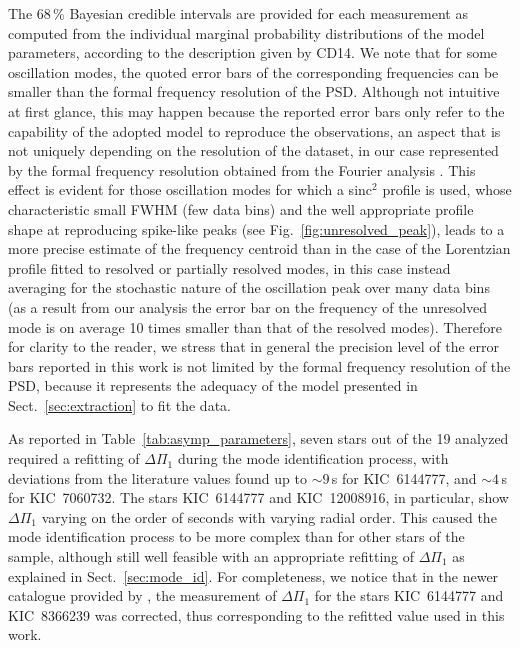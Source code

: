 \documentclass[structabstract]{aa}
\newcommand{\DP}{\Delta\Pi_1}
\newcommand{\kic}{KIC~12008916}
\begin{document}
The 68\,\% Bayesian credible intervals are provided for each measurement as computed from the individual marginal probability distributions of the model parameters, according to the description given by CD14. We note that for some oscillation modes, the quoted error bars of the corresponding frequencies can be smaller than the formal frequency resolution of the PSD. Although not intuitive at first glance, this may happen because the reported error bars only refer to the capability of the adopted model to reproduce the observations, an aspect that is not uniquely depending on the resolution of the dataset, in our case represented by the formal frequency resolution obtained from the Fourier analysis \citep[e.g. see][for more discussion on the presence of error bars smaller than the resolution given by the data, as obtained from another astrophysical application of the Bayesian inference]{Froehlich12}. This effect is evident for those oscillation modes for which a sinc$^2$ profile is used, whose characteristic small FWHM (few data bins) and the well appropriate profile shape at reproducing spike-like peaks (see Fig.~\ref{fig:unresolved_peak}), leads to a more precise estimate of the frequency centroid than in the case of the Lorentzian profile fitted to resolved or partially resolved modes, in this case instead averaging for the stochastic nature of the oscillation peak over many data bins (as a result from our analysis the error bar on the frequency of the unresolved mode is on average 10 times smaller than that of the resolved modes). Therefore for clarity to the reader, we stress that in general the precision level of the error bars reported in this work is not limited by the formal frequency resolution of the PSD, because it represents the adequacy of the model presented in Sect.~\ref{sec:extraction} to fit the data.

As reported in Table~\ref{tab:asymp_parameters}, seven stars out of the 19 analyzed required a refitting of $\DP$ during the mode identification process, with deviations from the literature values found up to $\sim9$\,s for KIC~6144777, and $\sim4$\,s for KIC~7060732. The stars KIC~6144777 and \kic, in particular, show $\DP$ varying on the order of seconds with varying radial order. This caused the mode identification process to be more complex than for other stars of the sample, although still well feasible with an appropriate refitting of $\DP$ as explained in Sect.~\ref{sec:mode_id}. For completeness, we notice that in the newer catalogue provided by \cite{Mosser14}, the measurement of $\DP$ for the stars KIC~6144777 and KIC~8366239 was corrected, thus corresponding to the refitted value used in this work.
\end{document}
